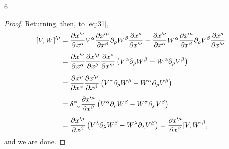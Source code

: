 \documentclass[11pt]{article}
\begin{document}
\begin{problem}{6}
\begin{enumerate}[label=(\alph*)]
\begin{proof}
			      Returning, then, to \cref{eq:31},
			      \begin{equation}
				      \label{eq:33}
				      \begin{aligned}
					      \comm{V}{W}^{\prime\mu} & = \frac{\partial x^{\prime\nu}}{\partial x^{\alpha}} V^{\alpha} \frac{\partial x^{\prime\mu}}{\partial x^{\beta}} \partial_{\rho}W^{\beta} \frac{\partial x^{\rho}}{\partial x^{\prime\nu}} - \frac{\partial x^{\prime\nu}}{\partial x^{\alpha}} W^{\alpha} \frac{\partial x^{\prime\mu}}{\partial x^{\beta}} \partial_{\rho}V^{\beta} \frac{\partial x^{\rho}}{\partial x^{\prime\nu}} \\[.5em]
					                              & = \frac{\partial x^{\prime\nu}}{\partial x^{\alpha}}  \frac{\partial x^{\prime\mu}}{\partial x^{\beta}} \frac{\partial x^{\rho}}{\partial x^{\prime\nu}} \left( V^{\alpha}\partial_{\rho}W^{\beta} - W^{\alpha}\partial_{\rho} V^{\beta} \right)                                                                                                                                        \\[.5em]
					                              & = \frac{\partial x^{\rho}}{\partial x^{\alpha}} \frac{\partial x^{\prime\mu}}{\partial x^{\beta}} \left( V^{\alpha}\partial_{\rho}W^{\beta} - W^{\alpha}\partial_{\rho}V^{\beta} \right)                                                                                                                                                                                                \\[.5em]
					                              & = \tensor{\delta}{^{\rho}_{\alpha} } \frac{\partial x^{\prime\mu}}{\partial x^{\beta}} \left( V^{\alpha}\partial_{\rho} W^{\beta} - W^{\alpha}\partial_{\rho} V^{\beta} \right)                                                                                                                                                                                                         \\[.5em]
					                              & = \frac{\partial x^{\prime\mu}}{\partial x^{\beta}} \left( V^{\lambda}\partial_{\lambda}W^{\beta} - W^{\lambda}\partial_{\lambda} V^{\beta} \right) = \frac{\partial x^{\prime\mu}}{\partial x^{\beta}} \comm{V}{W}^{\beta},
				      \end{aligned}
			      \end{equation}
			      and we are done.
		      \end{proof}
	\end{enumerate}
\end{problem}
\end{document}
